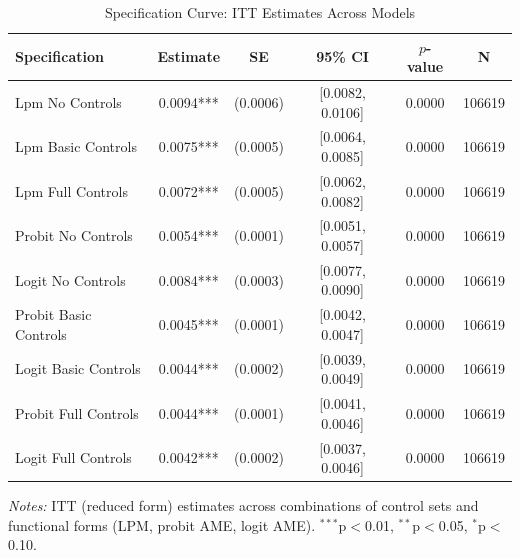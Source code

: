 \begin{table}[htbp]
\centering
\caption{Specification Curve: ITT Estimates Across Models}
\label{tab:spec_curve}
\begin{tabular}{l ccccc}
\toprule
Specification & Estimate & SE & 95\% CI & $p$-value & N \\
\midrule
  Lpm No Controls & 0.0094*** & (0.0006) & [0.0082, 0.0106] & 0.0000 & 106619 \\
  Lpm Basic Controls & 0.0075*** & (0.0005) & [0.0064, 0.0085] & 0.0000 & 106619 \\
  Lpm Full Controls & 0.0072*** & (0.0005) & [0.0062, 0.0082] & 0.0000 & 106619 \\
  Probit No Controls & 0.0054*** & (0.0001) & [0.0051, 0.0057] & 0.0000 & 106619 \\
  Logit No Controls & 0.0084*** & (0.0003) & [0.0077, 0.0090] & 0.0000 & 106619 \\
  Probit Basic Controls & 0.0045*** & (0.0001) & [0.0042, 0.0047] & 0.0000 & 106619 \\
  Logit Basic Controls & 0.0044*** & (0.0002) & [0.0039, 0.0049] & 0.0000 & 106619 \\
  Probit Full Controls & 0.0044*** & (0.0001) & [0.0041, 0.0046] & 0.0000 & 106619 \\
  Logit Full Controls & 0.0042*** & (0.0002) & [0.0037, 0.0046] & 0.0000 & 106619 \\
\bottomrule
\end{tabular}
\begin{tablenotes}
\small
\item \textit{Notes:} ITT (reduced form) estimates across combinations of control sets and functional forms (LPM, probit AME, logit AME). $^{***}$p$<$0.01, $^{**}$p$<$0.05, $^{*}$p$<$0.10.
\end{tablenotes}
\end{table}